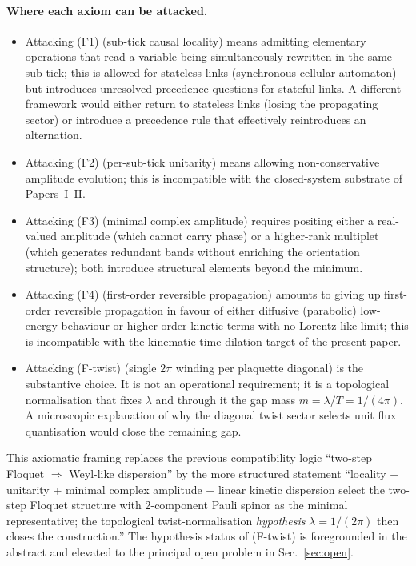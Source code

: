 \documentclass[11pt,a4paper]{article}
\begin{document}
\paragraph{Where each axiom can be attacked.}
\begin{itemize}
\item Attacking (F1) (sub-tick causal locality) means
admitting elementary operations that read a variable being
simultaneously rewritten in the same sub-tick; this is allowed
for stateless links (synchronous cellular automaton) but
introduces unresolved precedence questions for stateful links.
A different framework would either return to stateless links
(losing the propagating sector) or introduce a precedence rule
that effectively reintroduces an alternation.
\item Attacking (F2) (per-sub-tick unitarity) means allowing
non-conservative amplitude evolution; this is incompatible with
the closed-system substrate of Papers~I--II.
\item Attacking (F3) (minimal complex amplitude) requires
positing either a real-valued amplitude (which cannot carry
phase) or a higher-rank multiplet (which generates redundant
bands without enriching the orientation structure); both
introduce structural elements beyond the minimum.
\item Attacking (F4) (first-order reversible propagation)
amounts to giving up first-order reversible propagation in
favour of either diffusive (parabolic) low-energy behaviour or
higher-order kinetic terms with no Lorentz-like limit; this
is incompatible with the kinematic time-dilation target of the
present paper.
\item Attacking (F-twist) (single $2\pi$ winding per plaquette
diagonal) is the substantive choice. It is not an operational
requirement; it is a topological normalisation that fixes
$\lambda$ and through it the gap mass $m = \lambda/T = 1/(4\pi)$.
A microscopic explanation of why the diagonal twist sector
selects unit flux quantisation would close the remaining gap.
\end{itemize}

This axiomatic framing replaces the previous compatibility
logic ``two-step Floquet $\Rightarrow$ Weyl-like dispersion'' by
the more structured statement ``locality + unitarity + minimal
complex amplitude + linear kinetic dispersion select the
two-step Floquet structure with 2-component Pauli spinor as the
minimal representative; the topological twist-normalisation
\emph{hypothesis} $\lambda = 1/(2\pi)$ then closes the
construction.'' The hypothesis status of (F-twist) is
foregrounded in the abstract and elevated to the principal open
problem in Sec.~\ref{sec:open}.
\end{document}
